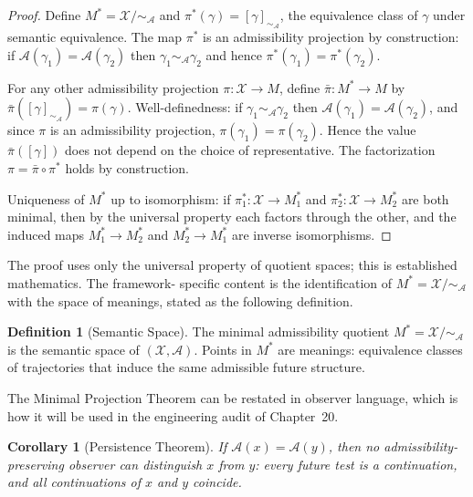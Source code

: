 \documentclass[12pt, oneside]{book}
\theoremstyle{flyxion}
\newtheorem{corollary}[theorem]{Corollary}
\theoremstyle{definition}
\newtheorem{definition}[theorem]{Definition}
\begin{document}
\begin{proof}
Define $M^* = \mathcal{X} / {\sim_{\mathcal{A}}}$ and
$\pi^*(\gamma) = [\gamma]_{\sim_{\mathcal{A}}}$, the
equivalence class of $\gamma$ under semantic equivalence.
The map $\pi^*$ is an admissibility projection by
construction: if $\mathcal{A}(\gamma_1) = \mathcal{A}(\gamma_2)$
then $\gamma_1 \sim_{\mathcal{A}} \gamma_2$ and hence
$\pi^*(\gamma_1) = \pi^*(\gamma_2)$.

For any other admissibility projection $\pi : \mathcal{X}
\to M$, define $\bar\pi : M^* \to M$ by
$\bar\pi([\gamma]_{\sim_{\mathcal{A}}}) = \pi(\gamma)$.
Well-definedness: if $\gamma_1 \sim_{\mathcal{A}} \gamma_2$
then $\mathcal{A}(\gamma_1) = \mathcal{A}(\gamma_2)$, and
since $\pi$ is an admissibility projection,
$\pi(\gamma_1) = \pi(\gamma_2)$. Hence the value
$\bar\pi([\gamma])$ does not depend on the choice of
representative. The factorization $\pi = \bar\pi \circ \pi^*$
holds by construction.

Uniqueness of $M^*$ up to isomorphism: if $\pi_1^* :
\mathcal{X} \to M_1^*$ and $\pi_2^* : \mathcal{X} \to
M_2^*$ are both minimal, then by the universal property
each factors through the other, and the induced maps
$M_1^* \to M_2^*$ and $M_2^* \to M_1^*$ are inverse
isomorphisms.
\end{proof}

The proof uses only the universal property of quotient
spaces; this is established mathematics. The framework-
specific content is the identification of $M^* =
\mathcal{X}/{\sim_{\mathcal{A}}}$ with the space of
meanings, stated as the following definition.

\begin{definition}[Semantic Space]
The minimal admissibility quotient $M^* = \mathcal{X}/
{\sim_{\mathcal{A}}}$ is the semantic space of
$(\mathcal{X}, \mathcal{A})$. Points in $M^*$ are
meanings: equivalence classes of trajectories that
induce the same admissible future structure.
\end{definition}

The Minimal Projection Theorem can be restated in observer
language, which is how it will be used in the engineering audit
of Chapter~20.

\begin{corollary}[Persistence Theorem]
\label{cor:persistence}
If $\mathcal{A}(x) = \mathcal{A}(y)$, then no
admissibility-preserving observer can distinguish $x$ from $y$:
every future test is a continuation, and all continuations of
$x$ and $y$ coincide.
\end{corollary}
\end{document}
